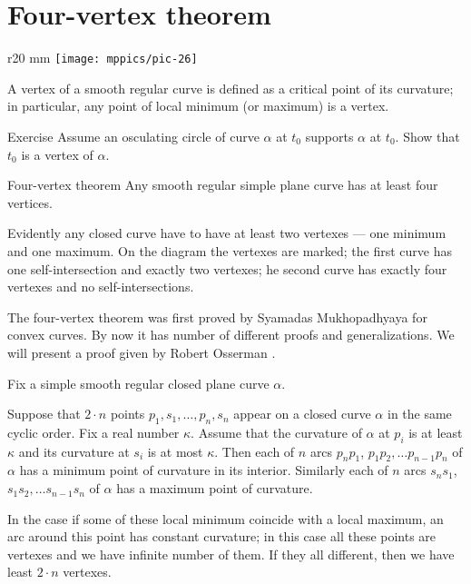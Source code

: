 \section{Four-vertex theorem}

\begin{wrapfigure}[8]{r}{20 mm}
\vskip-4mm
\centering
\texttt{[image: mppics/pic-26]}
\vskip0mm
\end{wrapfigure}

A vertex of a smooth regular curve is defined as a critical point of its curvature;
in particular, any point of local minimum (or maximum) is a vertex.

\begin{thm}{Exercise}\label{ex:vert-support}
Assume an osculating circle of curve $\alpha$ at $t_0$ supports $\alpha$ at $t_0$.
Show that $t_0$ is a vertex of $\alpha$.
\end{thm}

\begin{thm}{Four-vertex theorem}\label{thm:4-vert}
Any smooth regular simple plane curve has at least four
vertices.
\end{thm}


Evidently any closed curve have to have at least two vertexes --- one minimum and one maximum.
On the diagram the vertexes are marked;
the first curve has one self-intersection and exactly two vertexes;
he second curve has exactly four vertexes and no self-intersections.

The four-vertex theorem was first proved by Syamadas Mukhopadhyaya \cite{mukhopadhyaya} for convex curves.
By now it has number of different proofs and generalizations.
We will present a proof given by Robert Osserman \cite{osserman}.

Fix a simple smooth regular closed plane curve $\alpha$.

Suppose that $2\cdot n$ points $p_1,s_1,\dots,p_n,s_n$ appear on a closed curve $\alpha$ in the same cyclic order.
Fix a real number $\kappa$.
Assume that the curvature of $\alpha$ at $p_i$ is at least $\kappa$ and its curvature at $s_i$ is at most $\kappa$.
Then each of $n$ arcs $p_{n}p_1$, $p_{1}p_2, \dots p_{n-1}p_n$ of
$\alpha$ has a minimum point of curvature in its interior.
Similarly each of $n$ arcs $s_{n}s_1$, $s_{1}s_2, \dots s_{n-1}s_n$ of
$\alpha$ has a maximum point of curvature.

In the case if some of these local minimum coincide with a local maximum,
an arc around this point has constant curvature;
in this case all these points are vertexes and we have infinite number of them.
If they all different, then we have least $2\cdot n$ vertexes.

